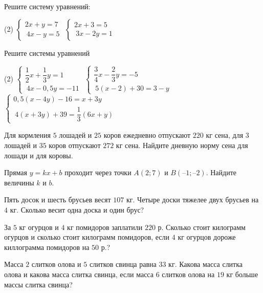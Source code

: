 %
%

\begin{class}[number=1]
	\begin{listofex}
		\item Решите систему уравнений:
		\begin{tasks}(2)
			\task \( \begin{cases}
				 2x+y=7 \\\
				 4x-y=5 
			\end{cases} \)
			\task \( \begin{cases}
				 2x+3=5 \\\
				 3x-2y=1 
			\end{cases} \)
		\end{tasks}
		\item Решите системы уравнений
		\begin{tasks}(2)
			\task \( \begin{cases}
				\dfrac{1}{2}x+\dfrac{1}{3}y=1 \\\
				4x-0,5 y=-11
			\end{cases} \)
			\task \( \begin{cases}
				\dfrac{3}{4}x-\dfrac{2}{3}y=-5\\\
				5(x-2)+30=3-y
			\end{cases} \)
			\task \( \begin{cases}
				0,5(x-4y)-16=x+3y \\\
				4(x+3y)+39=\dfrac{1}{3}(6x+y)
			\end{cases} \)
		\end{tasks}
		\item Для кормления \( 5 \) лошадей и \( 25 \) коров ежедневно отпускают \(  220 \) кг сена, для \( 3 \) лошадей и \( 35 \) коров отпускают \( 272 \) кг сена. Найдите дневную норму сена для лошади и для коровы.
		\item Прямая \( y = kx + b \) проходит через точки \( A (2; 7) \) и \( B (–1; –2) \). Найдите величины \( k \) и \( b \).
		\item Пять досок и шесть брусьев весят \( 107 \) кг. Четыре доски тяжелее двух брусьев на \( 4 \) кг. Сколько весит одна доска и один брус?
		\item За \( 5 \) кг огурцов и \( 4 \) кг помидоров заплатили \( 220 \) р. Сколько стоит килограмм огурцов и сколько стоит килограмм помидоров, если \( 4 \) кг огурцов дороже киллограмма помидоров на \( 50 \) р.?
		\item Масса \( 2 \) слитков олова и \( 5 \) слитков свинца равна \( 33 \) кг. Какова масса слитка олова и какова масса слитка свинца, если масса \( 6 \) слитков олова на \( 19 \) кг больше массы слитка свинца?

\end{listofex}
\end{class}
